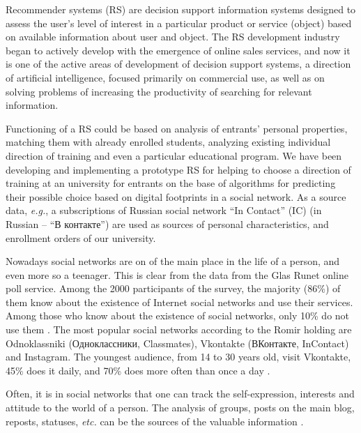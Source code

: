 \documentclass[conference]{IEEEtran}
\begin{document}
Recommender systems (RS) \cite{rs_basic6} are decision support information systems designed to assess the user's level of interest in a particular product or service (object) based on available information about user and object.  The RS development industry began to actively develop with the emergence of online sales services, and now it is one of the active areas of development of decision support systems, a direction of artificial intelligence, focused primarily on commercial use, as well as on solving problems of increasing the productivity of searching for relevant information.

Functioning of a RS could be based on analysis of entrants' personal properties, matching them with already enrolled students, analyzing existing individual direction of training and even a particular educational program.  We have been developing and implementing a prototype RS for helping to choose a direction of training at an university for entrants on the base of algorithms for predicting their possible choice based on digital footprints in a social network. As a source data, \emph{e.g.}, a subscriptions of Russian social network ``In Contact'' (IC) (in Russian -- ``В контакте'') are used as sources of personal characteristics, and enrollment orders of our university.  %

Nowadays social networks are on of the main place in the life of a person, and even more so a teenager.  This is clear from the data from the Glas Runet online poll service.  Among the 2000 participants of the survey, the majority (86\%) of them know about the existence of Internet social networks and use their services.  Among those who know about the existence of social networks, only 10\% do not use them \cite{c2}.
The most popular social networks according to the Romir holding are Odnoklassniki (Одноклассники, Classmates), Vkontakte (ВКонтакте, InContact) and Instagram.  The youngest audience, from 14 to 30 years old, visit Vkontakte, 45\% does it daily, and 70\% does more often than once a day \cite{c6}.

Often, it is in social networks that one can track the self-expression, interests and attitude to the world of a person. The analysis of groups, posts on the main blog, reposts, statuses, \emph{etc.} can be the sources of the valuable information \cite{c7}.
\end{document}
